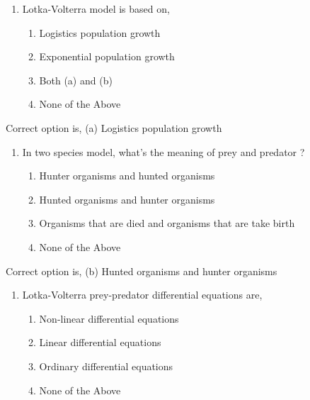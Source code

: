 \documentclass[12pt,a4paper]{article}
\begin{document}
    \vspace*{0.5cm}

    \begin{enumerate}[label=8.]
        \item Lotka-Volterra model is based on,
        \begin{enumerate}
            \item Logistics population growth
            \item Exponential population growth
            \item Both (a) and (b)
            \item None of the Above
        \end{enumerate}
    \end{enumerate}

    Correct option is, (a) Logistics population growth

    \pagebreak

    \vspace*{0.5cm}

    \begin{enumerate}[label=9.]
        \item In two species model, what's the meaning of prey and predator ?
        \begin{enumerate}
            \item Hunter organisms and hunted organisms
            \item Hunted organisms and  hunter organisms
            \item Organisms that are died and organisms that are take birth
            \item None of the Above
        \end{enumerate}
    \end{enumerate}

    Correct option is, (b) Hunted organisms and  hunter organisms

    \vspace*{0.5cm}

    \begin{enumerate}[label=10.]
        \item Lotka-Volterra prey-predator differential equations are, 
        \begin{enumerate}
            \item Non-linear differential equations
            \item Linear differential equations
            \item Ordinary differential equations
            \item None of the Above
        \end{enumerate}
    \end{enumerate}
\end{document}
